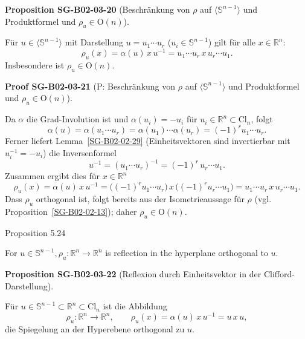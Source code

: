 \documentclass[10pt, letterpaper]{article}
\newcommand{\R}{\mathbb{R}}
\newcommand{\Cl}{\mathrm{Cl}}
\newcommand{\Ogroup}{\mathrm{O}}
\newcommand{\CustomHeading}[3]{%
  \par\medskip\noindent%
  \textbf{#1 #2} \textnormal{(#3)}.\enskip%
}
\newenvironment{PROP}[2]{\begin{unitbox}\CustomHeading{Proposition}{#1}{#2}}{\end{unitbox}}
\newenvironment{PROOF}[2]{\begin{unitbox}\CustomHeading{Proof}{#1}{#2}}{\end{unitbox}}
\begin{document}
\begin{PROP}{SG-B02-03-20}{Beschränkung von \(\rho\) auf \(\langle\mathbb S^{n-1}\rangle\) und Produktformel und $\rho_u\in \Ogroup(n)$}
Für \(u\in\langle\mathbb S^{n-1}\rangle\) mit Darstellung \(u=u_1\cdots u_r\) (\(u_i\in\mathbb S^{n-1}\)) gilt für alle \(x\in\R^n\):
\[
\rho_u(x)=\alpha(u)\,x\,u^{-1}
= u_1\cdots u_r\,x\,u_r\cdots u_1.
\]
Insbesondere ist \(\rho_u\in \mathrm{O}(n)\).
\end{PROP}



\begin{PROOF}{SG-B02-03-21}{P: Beschränkung von \(\rho\) auf \(\langle\mathbb S^{n-1}\rangle\) und Produktformel und $\rho_u\in \Ogroup(n)$}
Da \(\alpha\) die Grad-Involution ist und \(\alpha(u_i)=-u_i\) für \(u_i\in\R^n\subset\Cl_n\), folgt
\[
\alpha(u)=\alpha(u_1\cdots u_r)=\alpha(u_1)\cdots\alpha(u_r)=(-1)^r u_1\cdots u_r.
\]
Ferner liefert Lemma~\ref{SG-B02-02-29} (Einheitsvektoren sind invertierbar mit \(u_i^{-1}=-u_i\)) die Inversenformel
\[
u^{-1}=(u_1\cdots u_r)^{-1}=(-1)^r\,u_r\cdots u_1.
\]
Zusammen ergibt dies für \(x\in\R^n\)
\[
\rho_u(x)=\alpha(u)\,x\,u^{-1}
= \big((-1)^r u_1\cdots u_r\big)\,x\,\big((-1)^r u_r\cdots u_1\big)
= u_1\cdots u_r\,x\,u_r\cdots u_1.
\]
Dass \(\rho_u\) orthogonal ist, folgt bereits aus der Isometrieaussage für \(\rho\) (vgl. Proposition~\ref{SG-B02-02-13}); daher \(\rho_u\in\mathrm{O}(n)\).
\end{PROOF}




Proposition 5.24

For $u \in \mathbb{S}^{n-1}, \rho_{u}: \mathbb{R}^{n} \longrightarrow \mathbb{R}^{n}$ is reflection in the hyperplane orthogonal to $u$.



\begin{PROP}{SG-B02-03-22}{Reflexion durch Einheitsvektor in der Clifford-Darstellung}
Für \(u \in \mathbb S^{n-1} \subset \R^n \subset \Cl_n\) ist die Abbildung
\[
\rho_u : \R^n \longrightarrow \R^n, 
\qquad
\rho_u(x) = \alpha(u)\,x\,u^{-1} = u\,x\,u,
\]
die Spiegelung an der Hyperebene orthogonal zu \(u\).
\end{PROP}
\end{document}
